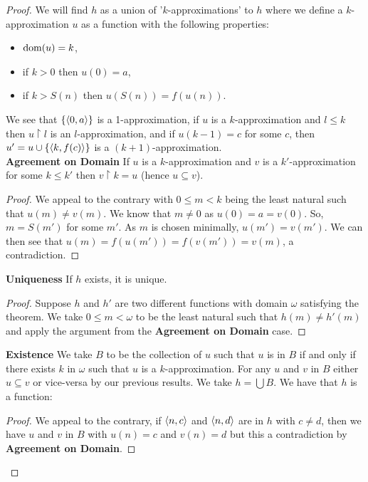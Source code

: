 \begin{proof}
    We will find $h$ as a union of '$k$-approximations' to $h$ where we define a
    $k$-approximation $u$ as a function with the following properties:
    \begin{itemize}
        \item $\operatorname{dom}(u) = k$,
        \item if $k > 0$ then $u(0) = a$,
        \item if $k > S(n)$ then $u(S(n)) = f(u(n))$.
    \end{itemize} We see that $\{{\langle 0, a \rangle}\}$ is a 1-approximation,
    if $u$ is a $k$-approximation and $l \leq k$ then $u \upharpoonright l$ is an 
    $l$-approximation, and if $u(k - 1) = c$ for some $c$, then $u' = u \cup \{{\langle k, f(c) \rangle}\}$
    is a $(k + 1)$-approximation.
    \\[\baselineskip]
    \textbf{Agreement on Domain}
    If $u$ is a $k$-approximation and $v$ is a
    $k'$-approximation for some $k \leq k'$ then $v \upharpoonright k = u$
    (hence $u \subseteq v$). \begin{proof}
        We appeal to the contrary with $0 \leq m < k$ being the least
        natural such that $u(m) \neq v(m)$. We know that $m \neq 0$ as
        $u(0) = a = v(0)$. So, $m = S(m')$ for some $m'$. As $m$ is chosen
        minimally, $u(m') = v(m')$. We can then see that
        $u(m) = f(u(m')) = f(v(m')) = v(m)$, a contradiction.
    \end{proof}
    \noindent
    \textbf{Uniqueness}
    If $h$ exists, it is unique.
    \begin{proof}
        Suppose $h$ and $h'$ are two different functions with domain $\omega$
        satisfying the theorem. We take $0 \leq m < \omega$ to be the least
        natural such that $h(m) \neq h'(m)$ and apply the argument from the
        \textbf{Agreement on Domain} case.
    \end{proof}
    \noindent
    \textbf{Existence} 
    We take $B$ to be the collection of $u$ such that $u$ is in $B$ 
    if and only if there exists $k$ in $\omega$ such that
    $u$ is a $k$-approximation. For any $u$ and $v$ in $B$ either $u \subseteq v$
    or vice-versa by our previous results. We take $h = \bigcup B$.
    We have that $h$ is a function: \begin{proof}
        We appeal to the contrary, if ${\langle n, c \rangle}$ and ${\langle n, d \rangle}$ are in 
        $h$ with $c \neq d$, then we have $u$ and $v$ in $B$ with $u(n) = c$ and $v(n) = d$
        but this a contradiction by \textbf{Agreement on Domain}.

\end{proof}
\end{proof}
